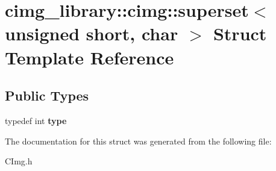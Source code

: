\hypertarget{structcimg__library_1_1cimg_1_1superset_3_01unsigned_01short_00_01char_01_4}{\section{cimg\-\_\-library\-:\-:cimg\-:\-:superset$<$ unsigned short, char $>$ Struct Template Reference}
\label{structcimg__library_1_1cimg_1_1superset_3_01unsigned_01short_00_01char_01_4}
}
\subsection*{Public Types}
\begin{DoxyCompactItemize}
\item 
\hypertarget{structcimg__library_1_1cimg_1_1superset_3_01unsigned_01short_00_01char_01_4_aba777a11fb45883f5f79998427b67939}{typedef int {\bfseries type}}\label{structcimg__library_1_1cimg_1_1superset_3_01unsigned_01short_00_01char_01_4_aba777a11fb45883f5f79998427b67939}

\end{DoxyCompactItemize}


The documentation for this struct was generated from the following file\-:\begin{DoxyCompactItemize}
\item 
C\-Img.\-h\end{DoxyCompactItemize}
